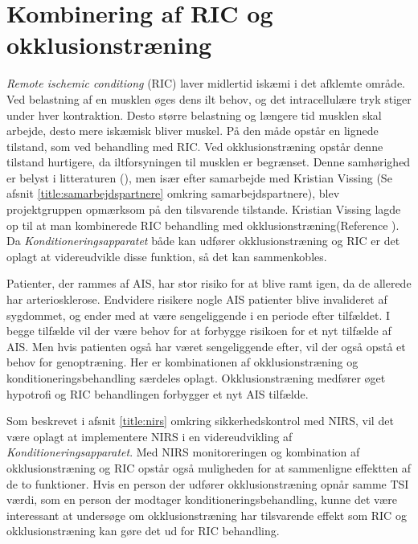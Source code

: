 \section{Kombinering af RIC og okklusionstræning}
\textit{Remote ischemic conditiong} (RIC) laver midlertid iskæmi i det afklemte område. Ved belastning af en musklen øges dens ilt behov, og det intracellulære tryk stiger under hver kontraktion. Desto større belastning og længere tid musklen skal arbejde, desto mere iskæmisk bliver muskel. På den måde opstår en lignede tilstand, som ved behandling med RIC. Ved okklusionstræning opstår denne tilstand hurtigere, da iltforsyningen til musklen er begrænset. Denne samhørighed er belyst i litteraturen (\cite{RefWorks:3}), men især efter samarbejde med Kristian Vissing (Se afsnit \ref{title:samarbejdspartnere} omkring samarbejdspartnere), blev projektgruppen opmærksom på den tilsvarende tilstande. Kristian Vissing lagde op til at man kombinerede RIC behandling med okklusionstræning(Reference ). Da \textit{Konditioneringsapparatet} både kan udfører okklusionstræning og RIC er det oplagt at videreudvikle disse funktion, så det kan sammenkobles. 

Patienter, der rammes af AIS, har stor risiko for at blive ramt igen, da de allerede har arteriosklerose. Endvidere risikere nogle AIS patienter blive invalideret af sygdommet, og ender med at være sengeliggende i en periode efter tilfældet. I begge tilfælde vil der være behov for at forbygge risikoen for et nyt tilfælde af AIS. Men hvis patienten også har været sengeliggende efter, vil der også opstå et behov for genoptræning. Her er kombinationen af okklusionstræning og konditioneringsbehandling særdeles oplagt. Okklusionstræning medfører øget hypotrofi og RIC behandlingen forbygger et nyt AIS tilfælde.   

Som beskrevet i afsnit \ref{title:nirs} omkring sikkerhedskontrol med NIRS, vil det være oplagt at implementere NIRS i en videreudvikling af \textit{Konditioneringsapparatet}. Med NIRS monitoreringen og kombination af okklusionstræning og RIC opstår også muligheden for at sammenligne effektten af de to funktioner. Hvis en person der udfører okklusionstræning opnår samme TSI værdi, som en person der modtager konditioneringsbehandling, kunne det være interessant at undersøge om okklusionstræning har tilsvarende effekt som RIC og okklusionstræning kan gøre det ud for RIC behandling. 
